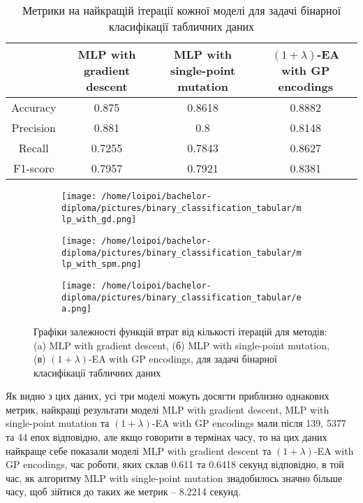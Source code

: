 \begin{table}[ht]
	\caption{Метрики на найкращій ітерації кожної моделі для задачі бінарної класифікації табличних даних}
	\label{metrics_bc_td_results}
	\centering
	\begin{adjustbox}{max width=\textwidth}
		\begin{tabular}{|c|c|c|c|}
			\hline 
			 & MLP with gradient descent & MLP with single-point mutation & $(1+\lambda)$-EA with GP encodings \\
			\hline 
			Accuracy & 0.875 & 0.8618 & 0.8882 \\
			\hline 
			Precision & 0.881 & 0.8 & 0.8148 \\
			\hline
			Recall & 0.7255 & 0.7843 & 0.8627 \\
			\hline
			F1-score & 0.7957 & 0.7921 & 0.8381 \\
			\hline
		\end{tabular}
	\end{adjustbox}
\end{table}

\begin{figure}[ht]
	\centering
	\begin{subfigure}[b]{0.32\textwidth}    
		\texttt{[image: /home/loipoi/bachelor-diploma/pictures/binary\_classification\_tabular/mlp\_with\_gd.png]}
		\caption{}
	\end{subfigure}
	\begin{subfigure}[b]{0.32\textwidth}
		\texttt{[image: /home/loipoi/bachelor-diploma/pictures/binary\_classification\_tabular/mlp\_with\_spm.png]}
		\caption{}
	\end{subfigure}	
	\begin{subfigure}[b]{0.32\textwidth}
		\texttt{[image: /home/loipoi/bachelor-diploma/pictures/binary\_classification\_tabular/ea.png]}
		\caption{}
	\end{subfigure}
	
	\caption{Графіки залежності функцій втрат від кількості ітерацій для методів: (a) MLP with gradient descent, (б) MLP with single-point mutation, (в) $(1+\lambda)$-EA with GP encodings, для задачі бінарної класифікації табличних даних}
	\label{fig_losses_bc_td}
\end{figure}

Як видно з цих даних, усі три моделі можуть досягти приблизно однакових метрик, найкращі результати моделі MLP with gradient descent, MLP with single-point mutation та $(1+\lambda)$-EA with GP encodings мали після 139, 5377 та 44 епох відповідно, але якщо говорити в термінах часу, то на цих даних найкраще себе показали моделі MLP with gradient descent та $(1+\lambda)$-EA with GP encodings, час роботи, яких склав 0.611 та 0.6418 секунд відповідно, в той час, як алгоритму MLP with single-point mutation знадобилось значно більше часу, щоб зійтися до таких же метрик -- 8.2214 секунд.

